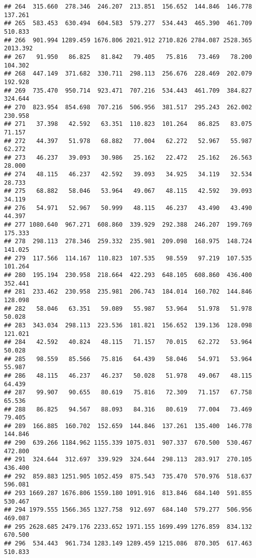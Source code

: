 \documentclass[
]{article}
\begin{document}
\begin{verbatim}
## 264  315.660  278.346  246.207  213.851  156.652  144.846  146.778  137.261
## 265  583.453  630.494  604.583  579.277  534.443  465.390  461.709  510.833
## 266  901.994 1289.459 1676.806 2021.912 2710.826 2784.087 2528.365 2013.392
## 267   91.950   86.825   81.842   79.405   75.816   73.469   78.200  104.302
## 268  447.149  371.682  330.711  298.113  256.676  228.469  202.079  192.928
## 269  735.470  950.714  923.471  707.216  534.443  461.709  384.827  324.644
## 270  823.954  854.698  707.216  506.956  381.517  295.243  262.002  230.958
## 271   37.398   42.592   63.351  110.823  101.264   86.825   83.075   71.157
## 272   44.397   51.978   68.882   77.004   62.272   52.967   55.987   62.272
## 273   46.237   39.093   30.986   25.162   22.472   25.162   26.563   28.000
## 274   48.115   46.237   42.592   39.093   34.925   34.119   32.534   28.733
## 275   68.882   58.046   53.964   49.067   48.115   42.592   39.093   34.119
## 276   54.971   52.967   50.999   48.115   46.237   43.490   43.490   44.397
## 277 1080.640  967.271  608.860  339.929  292.388  246.207  199.769  175.333
## 278  298.113  278.346  259.332  235.981  209.098  168.975  148.724  141.025
## 279  117.566  114.167  110.823  107.535   98.559   97.219  107.535  101.264
## 280  195.194  230.958  218.664  422.293  648.105  608.860  436.400  352.441
## 281  233.462  230.958  235.981  206.743  184.014  160.702  144.846  128.098
## 282   58.046   63.351   59.089   55.987   53.964   51.978   51.978   50.028
## 283  343.034  298.113  223.536  181.821  156.652  139.136  128.098  121.021
## 284   42.592   40.824   48.115   71.157   70.015   62.272   53.964   50.028
## 285   98.559   85.566   75.816   64.439   58.046   54.971   53.964   55.987
## 286   48.115   46.237   46.237   50.028   51.978   49.067   48.115   64.439
## 287   99.907   90.655   80.619   75.816   72.309   71.157   67.758   65.536
## 288   86.825   94.567   88.093   84.316   80.619   77.004   73.469   79.405
## 289  166.885  160.702  152.659  144.846  137.261  135.400  146.778  144.846
## 290  639.266 1184.962 1155.339 1075.031  907.337  670.500  530.467  472.800
## 291  324.644  312.697  339.929  324.644  298.113  283.917  270.105  436.400
## 292  859.883 1251.905 1052.459  875.543  735.470  570.976  518.637  596.081
## 293 1669.287 1676.806 1559.180 1091.916  813.846  684.140  591.855  530.467
## 294 1979.555 1566.365 1327.758  912.697  684.140  579.277  506.956  469.087
## 295 2628.685 2479.176 2233.652 1971.155 1699.499 1276.859  834.132  670.500
## 296  534.443  961.734 1283.149 1289.459 1215.086  870.305  617.463  510.833

\end{verbatim}
\end{document}
